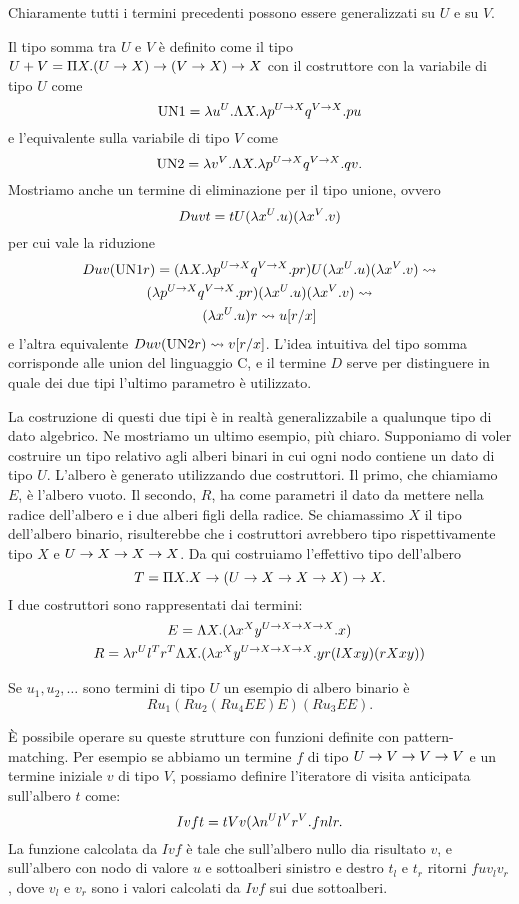 \documentclass[]{marticle}
\begin{document}
Chiaramente tutti i termini precedenti possono essere generalizzati su $U$ e su
$V$.

Il tipo somma tra $U$ e $V$ \`e definito come il tipo $U+V = \Pi X. (U\rightarrow X)
\rightarrow (V\rightarrow X) \rightarrow X$ con il costruttore con la variabile di tipo $U$ come 
\[
    \text{UN1} = \lambda u^U. \Lambda X. \lambda p^{U\rightarrow X} q^{V\rightarrow X}. pu
\]
e l'equivalente sulla variabile di tipo $V$ come 
\[
    \text{UN2} = \lambda v^V. \Lambda X. \lambda p^{U\rightarrow X} q^{V\rightarrow X}. qv.
\]
Mostriamo anche un termine di eliminazione per il tipo unione, ovvero
\[
    D uvt = tU (\lambda x^U.u)(\lambda x^V.v)
\]
per cui vale la riduzione
\begin{gather*}
    Duv(\text{UN1}r) = (\Lambda X. \lambda p^{U\rightarrow X}q^{V\rightarrow X}. pr) U (\lambda x^U.u)(\lambda
    x^V.v) \rightsquigarrow \\
    (\lambda p^{U\rightarrow X}q^{V\rightarrow X}. pr)(\lambda x^U.u)(\lambda x^V.v) \rightsquigarrow \\
    (\lambda x^U.u) r \rightsquigarrow u[r/x]
\end{gather*}
e l'altra equivalente $Duv(\text{UN2}r) \rightsquigarrow v[r/x]$.
L'idea intuitiva del tipo somma corrisponde alle union del linguaggio C, e il
termine $D$ serve per distinguere in quale dei due tipi l'ultimo parametro \`e
utilizzato.

La costruzione di questi due tipi \`e in realt\`a generalizzabile a qualunque
tipo di dato algebrico. Ne mostriamo un ultimo esempio, pi\`u chiaro. Supponiamo
di voler costruire un tipo relativo agli alberi binari in cui ogni nodo contiene
un dato di tipo $U$. L'albero \`e generato utilizzando due costruttori. Il
primo, che chiamiamo $E$, \`e l'albero vuoto. Il secondo, $R$, ha come parametri
il dato da mettere nella radice dell'albero e i due alberi figli della radice.
Se chiamassimo $X$ il tipo dell'albero binario, risulterebbe che i costruttori
avrebbero tipo rispettivamente tipo $X$ e $U \rightarrow X\rightarrow X \rightarrow X$. Da qui
costruiamo l'effettivo tipo dell'albero
\[
    T = \Pi X. X \rightarrow (U \rightarrow X \rightarrow X \rightarrow X) \rightarrow X.
\]
I due costruttori sono rappresentati dai termini:
\begin{gather*}
    E = \Lambda X. (\lambda x^X y^{U \rightarrow X \rightarrow X \rightarrow X}.x) \\
    R = \lambda r^U l^T r^T \Lambda X. (\lambda x^X y^{U \rightarrow X \rightarrow X \rightarrow X}.yr(lXxy)(rXxy))
\end{gather*}

Se $u_1, u_2,\dots$ sono termini di tipo $U$ un esempio di albero binario \`e 
\[
    Ru_1(Ru_2(Ru_4EE)E)(Ru_3EE).
\]

\`E possibile operare su queste strutture con funzioni definite con
pattern-matching. Per esempio se abbiamo un termine $f$ di tipo $U\rightarrow V \rightarrow V\rightarrow V$
e un termine iniziale $v$ di tipo $V$, possiamo definire l'iteratore di visita
anticipata sull'albero $t$ come:
\[
    Ivft = tVv(\lambda n^U l^V r^V. f nlr.
\]
La funzione calcolata da $Ivf$ \`e tale che sull'albero nullo dia risultato $v$,
e sull'albero con nodo di valore $u$ e sottoalberi sinistro e destro $t_l$ e
$t_r$ ritorni $f u v_l v_r$, dove $v_l$ e $v_r$ sono i valori calcolati da $Ivf$
sui due sottoalberi.
\end{document}
